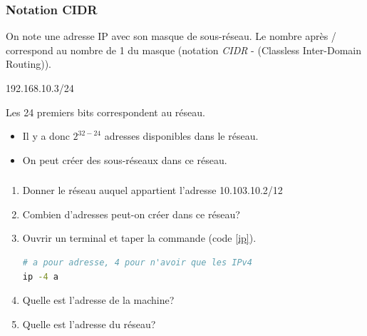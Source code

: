 \documentclass[svgnames,11pt]{beamer}
\begin{document}
\begin{frame}
    \frametitle{Notation CIDR}

    \begin{aretenir}[]
        On note une adresse IP avec son masque de sous-réseau. Le nombre après / correspond au nombre de 1 du masque (notation \emph{CIDR} - (Classless Inter-Domain Routing)).
        \begin{center}
            192.168.10.3/24
        \end{center}
        Les 24 premiers bits correspondent au réseau.
    \end{aretenir}
    \begin{itemize}
        \item Il y a donc $2^{32-24}$ adresses disponibles dans le réseau.
        \item On peut créer des sous-réseaux dans ce réseau.
    \end{itemize}
\end{frame}

\begin{frame}[fragile]
    \frametitle{}

    \begin{activite}
        \begin{enumerate}
            \item Donner le réseau auquel appartient l'adresse 10.103.10.2/12
            \item Combien d'adresses peut-on créer dans ce réseau?
            \item Ouvrir un terminal et taper la commande (code \ref{ip}).
            \begin{center}
                \begin{lstlisting}[language=bash]
# a pour adresse, 4 pour n'avoir que les IPv4
ip -4 a
                \end{lstlisting}
                \label{ip}
            \end{center}
    
            \item Quelle est l'adresse de la machine?
            \item Quelle est l'adresse du réseau?
        \end{enumerate}
    \end{activite}

\end{frame}
\end{document}
